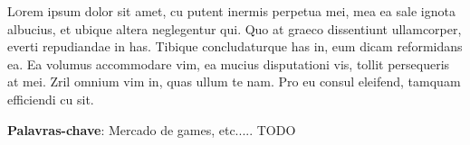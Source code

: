 \begin{resumo}
\lettrine[lines=3]{L}orem ipsum dolor sit amet, cu putent inermis perpetua mei, mea ea sale ignota albucius, et ubique altera neglegentur qui. Quo at graeco dissentiunt ullamcorper, everti repudiandae in has. Tibique concludaturque has in, eum dicam reformidans ea. Ea volumus accommodare vim, ea mucius disputationi vis, tollit persequeris at mei. Zril omnium vim in, quas ullum te nam. Pro eu consul eleifend, tamquam efficiendi cu sit.


\vspace{.7cm}
\noindent
\textbf{Palavras-chave}: Mercado de games, etc..... TODO
\end{resumo}
